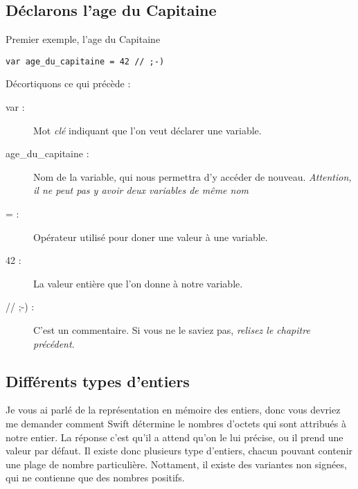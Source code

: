 \subsection{Déclarons l'age du Capitaine}
\begin{listing}[h]
\caption{Premier exemple, l'age du Capitaine}
\begin{verbatim}
var age_du_capitaine = 42 // ;-)
\end{verbatim}
\end{listing}
Décortiquons ce qui précède :
\begin{description}
\item[var :] Mot \emph{clé} indiquant que l'on veut déclarer une variable.
\item[age\_du\_capitaine :] Nom de la variable, qui nous permettra d'y accéder de nouveau. \emph{Attention, il ne peut pas y avoir deux variables de même nom}
\item[= :] Opérateur utilisé pour doner une valeur à une variable.
\item[42 :] La valeur entière que l'on donne à notre variable.
\item[// ;-) :] C'est un commentaire. Si vous ne le saviez pas, \emph{relisez le chapitre précédent}.
\end{description}
\subsection{Différents types d'entiers}
Je vous ai parlé de la représentation en mémoire des entiers, donc vous devriez me demander comment Swift détermine le nombres d'octets qui sont attribués à notre entier. La réponse c'est qu'il a attend qu'on  le lui précise, ou il prend une valeur par défaut.
Il existe donc plusieurs type d'entiers, chacun pouvant contenir une plage de nombre particulière. Nottament, il existe des variantes non signées, qui ne contienne que des nombres positifs.

